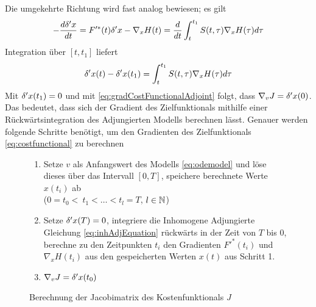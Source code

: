 Die umgekehrte Richtung wird fast analog bewiesen; es gilt
\begin{equation*}
 -\frac{d\delta 'x}{dt} = F'^*(t) \delta'x - \nabla_x H(t)
			 = \frac{d}{dt} \int_t^{t_1} S(t,\tau) \nabla_x H(\tau) d\tau
\end{equation*}
Integration über $[t,t_1]$ liefert
\[
 \delta 'x(t) -  \delta 'x(t_1)  = \int_t^{t_1} S(t,\tau) \nabla_x H(\tau) d\tau
\]
Mit $ \delta 'x(t_1) = 0$ und mit \eqref{eq:gradCostFunctionalAdjoint} folgt, dass $\nabla_v J = \delta'x(0)$. Das bedeutet, dass sich der Gradient des Zielfunktionals mithilfe einer Rückwärtsintegration des Adjungierten Modells berechnen lässt.
Genauer werden folgende Schritte benötigt, um den Gradienten des Zielfunktionals \eqref{eq:costfunctional} zu berechnen
\begin{figure}
\begin{framed}
 \begin{enumerate}
 \item Setze $v$ als Anfangswert des Modells \eqref{eq:odemodel} und löse dieses über das Intervall $[0,T]$, speichere berechnete Werte $x(t_i)$ ab\\
 ($0= t_0<~ t_1<\ldots<t_l=T$, $l\in \mathbb{N}$)
 \item Setze $\delta 'x(T) = 0$, integriere die Inhomogene Adjungierte Gleichung \eqref{eq:inhAdjEquation} rückwärts in der Zeit von $T$ bis $0$, berechne zu den Zeitpunkten $t_i$ den Gradienten $F'^*(t_i)$ und $\nabla_x H(t_i)$ aus den gespeicherten Werten $x(t)$ aus Schritt 1.
 \item $\nabla_v J = \delta 'x(t_0)$
\end{enumerate}
\end{framed}
\caption{Berechnung der Jacobimatrix des Kostenfunktionals $J$}
\end{figure}

% 

